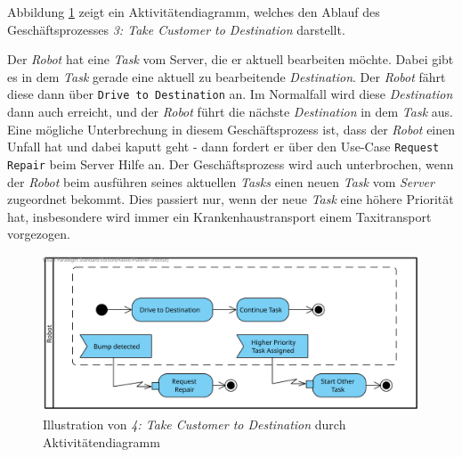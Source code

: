			Abbildung \ref{fig:2-4-take-customer-to-destination-aktivitaetendiagramm} zeigt ein Aktivitätendiagramm, welches den Ablauf des Geschäftsprozesses \emph{3: Take Customer to Destination} darstellt.

			Der \emph{Robot} hat eine \emph{Task} vom Server, die er aktuell bearbeiten möchte. Dabei gibt es in dem \emph{Task} gerade eine aktuell zu bearbeitende \emph{Destination}. Der \emph{Robot} fährt diese dann über \texttt{Drive to Destination} an. Im Normalfall wird diese \emph{Destination} dann auch erreicht, und der \emph{Robot} führt die nächste \emph{Destination} in dem \emph{Task} aus. Eine mögliche Unterbrechung in diesem Geschäftsprozess ist, dass der \emph{Robot} einen Unfall hat und dabei kaputt geht - dann fordert er über den Use-Case \texttt{Request Repair} beim Server Hilfe an. Der Geschäftsprozess wird auch unterbrochen, wenn der \emph{Robot} beim ausführen seines aktuellen \emph{Tasks} einen neuen \emph{Task} vom \emph{Server} zugeordnet bekommt. Dies passiert nur, wenn der neue \emph{Task} eine höhere Priorität hat, insbesondere wird immer ein Krankenhaustransport einem Taxitransport vorgezogen.
			
			\begin{figure}[H]
				\centering
				\includegraphics[width=\textwidth]{img/TakeCustomerToDestination}
				\caption{Illustration von \emph{4: Take Customer to Destination} durch Aktivitätendiagramm}
				\label{fig:2-4-take-customer-to-destination-aktivitaetendiagramm}
			\end{figure}
	\pagebreak

	
